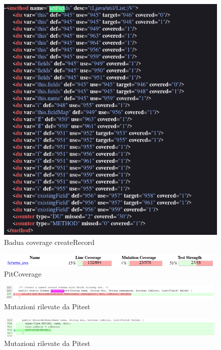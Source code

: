 \documentclass[12pt, a4paper]{article}
\begin{document}
  \begin{figure}
    \includegraphics[width=\linewidth]{./images/create_record/BaduaCoverage2.png}
    \caption{Badua coverage createRecord}
    \label{fig:BaduaCoverageCreateRecord2}
  \end{figure}

  \begin{figure}
    \includegraphics[width=\linewidth]{./images/create_record/PitCoverage1.png}
    \caption{PitCoverage}
    \label{fig:PitMutationCreateRecord1}
  \end{figure}

  \begin{figure}
    \includegraphics[width=\linewidth]{./images/create_record/PitCoverage2.png}
    \caption{Mutazioni rilevate da Pitest}
    \label{fig:PitMutationCreateRecord2}
  \end{figure}

  \begin{figure}
    \includegraphics[width=\linewidth]{./images/create_record/PitCoverage3.png}
    \caption{Mutazioni rilevate da Pitest}
    \label{fig:PitMutationCreateRecord3}
  \end{figure}
\end{document}
